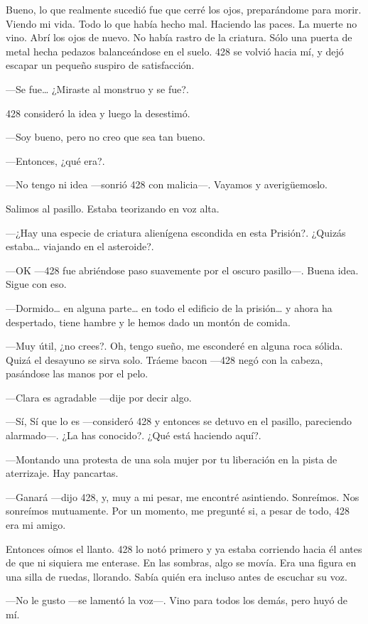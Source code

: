 Bueno, lo que realmente sucedió fue que cerré los ojos, preparándome
para morir. Viendo mi vida. Todo lo que había hecho mal. Haciendo las
paces. La muerte no vino. Abrí los ojos de nuevo. No había rastro de la
criatura. Sólo una puerta de metal hecha pedazos balanceándose en el
suelo. 428 se volvió hacia mí, y dejó escapar un pequeño suspiro de
satisfacción.

---Se fue\ldots{} ¿Miraste al monstruo y se fue?.

428 consideró la idea y luego la desestimó.

---Soy bueno, pero no creo que sea tan bueno.

---Entonces, ¿qué era?.

---No tengo ni idea ---sonrió 428 con malicia---. Vayamos y
averigüemoslo.

Salimos al pasillo. Estaba teorizando en voz alta.

---¿Hay una especie de criatura alienígena escondida en esta Prisión?.
¿Quizás estaba\ldots{} viajando en el asteroide?.

---OK ---428 fue abriéndose paso suavemente por el oscuro pasillo---.
Buena idea. Sigue con eso.

---Dormido\ldots{} en alguna parte\ldots{} en todo el edificio de la
prisión\ldots{} y ahora ha despertado, tiene hambre y le hemos dado un
montón de comida.

---Muy útil, ¿no crees?. Oh, tengo sueño, me esconderé en alguna roca
sólida. Quizá el desayuno se sirva solo. Tráeme bacon ---428 negó con la
cabeza, pasándose las manos por el pelo.

---Clara es agradable ---dije por decir algo.

---Sí, Sí que lo es ---consideró 428 y entonces se detuvo en el pasillo,
pareciendo alarmado---. ¿La has conocido?. ¿Qué está haciendo aquí?.

---Montando una protesta de una sola mujer por tu liberación en la pista
de aterrizaje. Hay pancartas.

---Ganará ---dijo 428, y, muy a mi pesar, me encontré asintiendo.
Sonreímos. Nos sonreímos mutuamente. Por un momento, me pregunté si, a
pesar de todo, 428 era mi amigo.

Entonces oímos el llanto. 428 lo notó primero y ya estaba corriendo
hacia él antes de que ni siquiera me enterase. En las sombras, algo se
movía. Era una figura en una silla de ruedas, llorando. Sabía quién era
incluso antes de escuchar su voz.

---No le gusto ---se lamentó la voz---. Vino para todos los demás, pero
huyó de mí.

